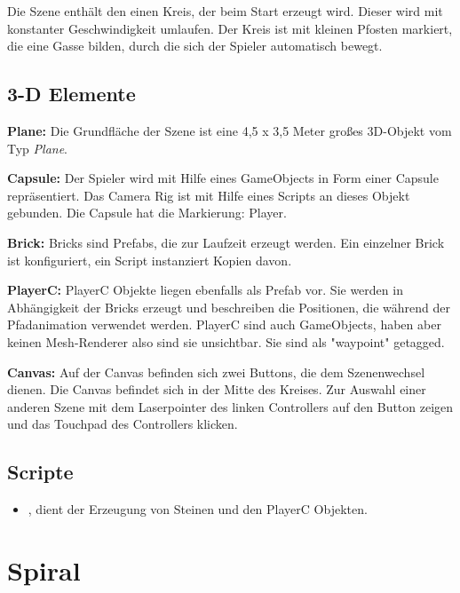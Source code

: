 Die Szene enthält den einen Kreis, der beim Start erzeugt wird. Dieser wird mit konstanter Geschwindigkeit umlaufen. Der Kreis ist mit kleinen Pfosten markiert, die eine Gasse bilden, durch die sich der Spieler automatisch bewegt.



\subsection{3-D Elemente}

\textbf{Plane: } Die Grundfläche der Szene ist eine 4,5 x 3,5 Meter großes 3D-Objekt vom Typ \emph{Plane}.

\textbf{Capsule: } Der Spieler wird mit Hilfe eines GameObjects in Form einer Capsule repräsentiert. Das Camera Rig ist mit Hilfe eines Scripts an dieses Objekt gebunden. Die Capsule hat die Markierung: Player.

\textbf{Brick: } Bricks sind Prefabs, die zur Laufzeit erzeugt werden. Ein einzelner Brick ist konfiguriert, ein Script instanziert Kopien davon.

\textbf{PlayerC: } PlayerC Objekte liegen ebenfalls als Prefab vor. Sie werden in Abhängigkeit der Bricks erzeugt und beschreiben die Positionen, die während der Pfadanimation verwendet werden. PlayerC sind auch GameObjects, haben aber keinen Mesh-Renderer also sind sie unsichtbar. Sie sind als "waypoint" getagged.

\textbf{Canvas: } Auf der Canvas befinden sich zwei Buttons, die dem Szenenwechsel dienen. Die Canvas befindet sich in der Mitte des Kreises. Zur Auswahl einer anderen Szene mit dem Laserpointer des linken Controllers auf den Button zeigen und das Touchpad des Controllers klicken. 


\subsection{Scripte}
\label{Circle_Scripts}
\begin{itemize}
	\item {}, dient der Erzeugung von Steinen und den PlayerC Objekten.
\end{itemize}


\section{Spiral}
\label{Spirale}

